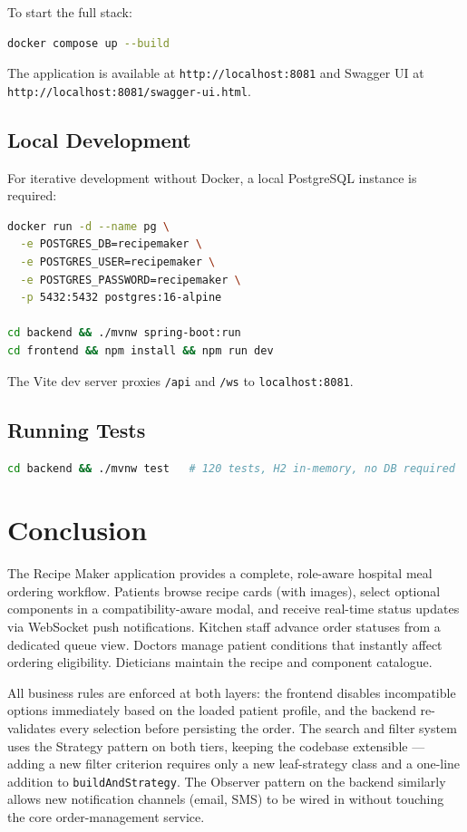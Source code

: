 \documentclass[12pt,a4paper]{article}
\begin{document}
To start the full stack:
\begin{lstlisting}[language=bash]
docker compose up --build
\end{lstlisting}
The application is available at \texttt{http://localhost:8081} and
Swagger UI at \texttt{http://localhost:8081/swagger-ui.html}.

\subsection{Local Development}
For iterative development without Docker, a local PostgreSQL instance is required:
\begin{lstlisting}[language=bash]
docker run -d --name pg \
  -e POSTGRES_DB=recipemaker \
  -e POSTGRES_USER=recipemaker \
  -e POSTGRES_PASSWORD=recipemaker \
  -p 5432:5432 postgres:16-alpine

cd backend && ./mvnw spring-boot:run
cd frontend && npm install && npm run dev
\end{lstlisting}
The Vite dev server proxies \texttt{/api} and \texttt{/ws} to
\texttt{localhost:8081}.

\subsection{Running Tests}
\begin{lstlisting}[language=bash]
cd backend && ./mvnw test   # 120 tests, H2 in-memory, no DB required
\end{lstlisting}

\section{Conclusion}
The Recipe Maker application provides a complete, role-aware hospital meal
ordering workflow.  Patients browse recipe cards (with images), select optional
components in a compatibility-aware modal, and receive real-time status updates
via WebSocket push notifications.  Kitchen staff advance order statuses from a
dedicated queue view.  Doctors manage patient conditions that instantly affect
ordering eligibility.  Dieticians maintain the recipe and component catalogue.

All business rules are enforced at both layers: the frontend disables
incompatible options immediately based on the loaded patient profile, and the
backend re-validates every selection before persisting the order.  The search
and filter system uses the Strategy pattern on both tiers, keeping the codebase
extensible — adding a new filter criterion requires only a new leaf-strategy
class and a one-line addition to \texttt{buildAndStrategy}.  The Observer
pattern on the backend similarly allows new notification channels (email, SMS)
to be wired in without touching the core order-management service.
\end{document}
